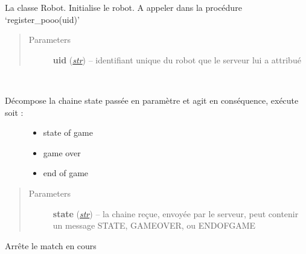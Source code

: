 \documentclass[letterpaper,10pt,english]{sphinxmanual}
\begin{document}
\begin{fulllineitems}
\label{index:Robot.Robot}
La classe Robot. 
Initialise le robot.
A appeler dans la procédure `register\_pooo(uid)'
\begin{quote}\begin{description}
\item[{Parameters}] \leavevmode
\textbf{uid} (\href{http://docs.python.org/library/functions.html\#str}{\emph{str}}) -- identifiant unique du robot que le serveur lui a attribué

\end{description}\end{quote}

\begin{fulllineitems}
\label{index:Robot.Robot.analyseMessage}~\begin{description}
\item[{Décompose la chaine state passée en paramètre et agit en conséquence, exécute soit :}] \leavevmode\begin{itemize}
\item {} 
state of game

\item {} 
game over

\item {} 
end of game

\end{itemize}

\end{description}
\begin{quote}\begin{description}
\item[{Parameters}] \leavevmode
\textbf{state} (\href{http://docs.python.org/library/functions.html\#str}{\emph{str}}) -- la chaine reçue, envoyée par le serveur, peut contenir un message STATE, GAMEOVER, ou ENDOFGAME

\end{description}\end{quote}

\end{fulllineitems}


\begin{fulllineitems}
\label{index:Robot.Robot.end_of_game}
Arrête le match en cours


\end{fulllineitems}
\end{fulllineitems}
\end{document}
